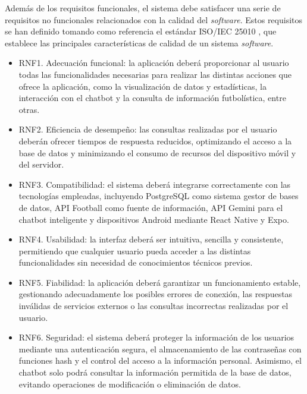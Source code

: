 Además de los requisitos funcionales, el sistema debe satisfacer una serie de requisitos no funcionales relacionados con la calidad del \textit{software}. Estos requisitos se han definido tomando como referencia el estándar ISO/IEC 25010 \cite{iso25010}, que establece las principales características de calidad de un sistema \textit{software}.

\begin{itemize}

    \item RNF1. Adecuación funcional: la aplicación deberá proporcionar al usuario todas las funcionalidades necesarias para realizar las distintas acciones que ofrece la aplicación, como la visualización de datos y estadísticas, la interacción con el chatbot y la consulta de información futbolística, entre otras.

    \item RNF2. Eficiencia de desempeño: las consultas realizadas por el usuario deberán ofrecer tiempos de respuesta reducidos, optimizando el acceso a la base de datos y minimizando el consumo de recursos del dispositivo móvil y del servidor.

    \item RNF3. Compatibilidad: el sistema deberá integrarse correctamente con las tecnologías empleadas, incluyendo PostgreSQL como sistema gestor de bases de datos, API Football como fuente de información, API Gemini para el chatbot inteligente y dispositivos Android mediante React Native y Expo.

    \item RNF4. Usabilidad: la interfaz deberá ser intuitiva, sencilla y consistente, permitiendo que cualquier usuario pueda acceder a las distintas funcionalidades sin necesidad de conocimientos técnicos previos.

    \item RNF5. Fiabilidad: la aplicación deberá garantizar un funcionamiento estable, gestionando adecuadamente los posibles errores de conexión, las respuestas inválidas de servicios externos o las consultas incorrectas realizadas por el usuario.

    \item RNF6. Seguridad: el sistema deberá proteger la información de los usuarios mediante una autenticación segura, el almacenamiento de las contraseñas con funciones hash y el control del acceso a la información personal. Asimismo, el chatbot solo podrá consultar la información permitida de la base de datos, evitando operaciones de modificación o eliminación de datos.


\end{itemize}
